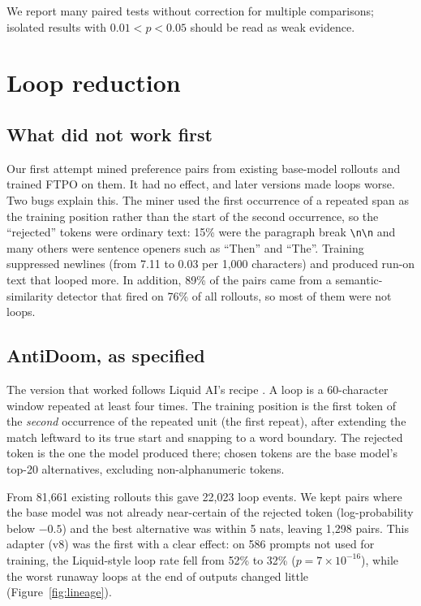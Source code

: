 \documentclass[11pt]{article}
\begin{document}
We report many paired tests without correction for multiple comparisons; isolated results with $0.01<p<0.05$ should be read as weak evidence.

\section{Loop reduction}
\label{sec:loops}

\subsection{What did not work first}

Our first attempt mined preference pairs from existing base-model rollouts and trained FTPO on them. It had no effect, and later versions made loops worse. Two bugs explain this. The miner used the first occurrence of a repeated span as the training position rather than the start of the second occurrence, so the ``rejected'' tokens were ordinary text: 15\% were the paragraph break \verb|\n\n| and many others were sentence openers such as ``Then'' and ``The''. Training suppressed newlines (from 7.11 to 0.03 per 1,000 characters) and produced run-on text that looped more. In addition, 89\% of the pairs came from a semantic-similarity detector that fired on 76\% of all rollouts, so most of them were not loops.

\subsection{AntiDoom, as specified}

The version that worked follows Liquid AI's recipe \citep{liquid2025antidoom}. A loop is a 60-character window repeated at least four times. The training position is the first token of the \emph{second} occurrence of the repeated unit (the first repeat), after extending the match leftward to its true start and snapping to a word boundary. The rejected token is the one the model produced there; chosen tokens are the base model's top-20 alternatives, excluding non-alphanumeric tokens.

From 81,661 existing rollouts this gave 22,023 loop events. We kept pairs where the base model was not already near-certain of the rejected token (log-probability below $-0.5$) and the best alternative was within 5 nats, leaving 1,298 pairs. This adapter (v8) was the first with a clear effect: on 586 prompts not used for training, the Liquid-style loop rate fell from 52\% to 32\% ($p=7\times10^{-16}$), while the worst runaway loops at the end of outputs changed little (Figure~\ref{fig:lineage}).
\end{document}
